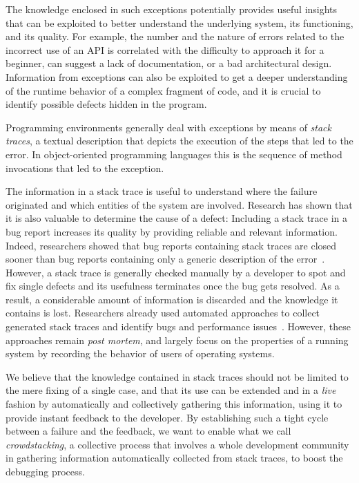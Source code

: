 The knowledge enclosed in such exceptions potentially provides useful insights that can be exploited to better understand the underlying system, its functioning, and its quality. For example, the number and the nature of errors related to the incorrect use of an API is correlated with the difficulty to approach it for a beginner, can suggest a lack of documentation, or a bad architectural design. Information from exceptions can also be exploited to get a deeper understanding of the runtime behavior of a complex fragment of code, and it is crucial to identify possible defects hidden in the program.

Programming environments generally deal with exceptions by means of \emph{stack traces}, a textual description that depicts the execution of the steps that led to the error. In object-oriented programming languages this is the sequence of method invocations that led to the exception.

The information in a stack trace is useful to understand where the failure originated and which entities of the system are involved. Research has shown that it is also valuable to determine the cause of a defect: Including a stack trace in a bug report increases its quality by providing reliable and relevant information. Indeed, researchers showed that bug reports containing stack traces are closed sooner than bug reports containing only a generic description of the error~\cite{Zimm2010a,Schr2010a}. However, a stack trace is generally checked manually by a developer to spot and fix single defects and its usefulness terminates once the bug gets resolved. As a result, a considerable amount of information is discarded and the knowledge it contains is lost. Researchers already used automated approaches to collect generated stack traces and identify bugs and performance issues~\cite{Glerum2009,Han2012}. However, these approaches remain \emph{post mortem}, and largely focus on the properties of a running system by recording the behavior of users of operating systems.

We believe that the knowledge contained in stack traces should not be limited to the mere fixing of a single case, and that its use can be extended and in a \emph{live} fashion by automatically and collectively gathering this information, using it to provide instant feedback to the developer. By establishing such a tight cycle between a failure and the feedback, we want to enable what we call \emph{crowdstacking}, a collective process that involves a whole development community in gathering information automatically collected from stack traces, to boost the debugging process.

